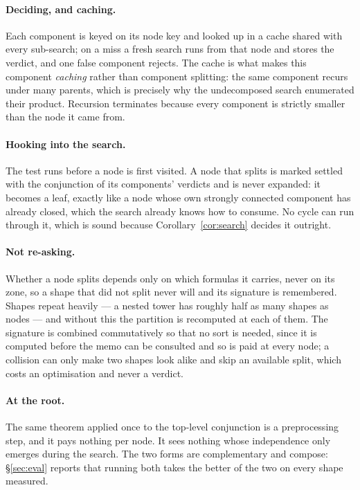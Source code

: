\paragraph{Deciding, and caching.} Each component is keyed on its node key and
looked up in a cache shared with every sub-search; on a miss a fresh search runs
from that node and stores the verdict, and one false component rejects. The
cache is what makes this component \emph{caching} rather than component
splitting: the same component recurs under many parents, which is precisely why
the undecomposed search enumerated their product. Recursion terminates because
every component is strictly smaller than the node it came from.

\paragraph{Hooking into the search.} The test runs before a node is first
visited. A node that splits is marked settled with the conjunction of its
components' verdicts and is never expanded: it becomes a leaf, exactly like a
node whose own strongly connected component has already closed, which the search
already knows how to consume. No cycle can run through it, which is sound
because Corollary~\ref{cor:search} decides it outright.

\paragraph{Not re-asking.} Whether a node splits depends only on which formulas
it carries, never on its zone, so a shape that did not split never will and its
signature is remembered. Shapes repeat heavily --- a nested tower has roughly
half as many shapes as nodes --- and without this the partition is recomputed at
each of them. The signature is combined commutatively so that no sort is needed,
since it is computed before the memo can be consulted and so is paid at every
node; a collision can only make two shapes look alike and skip an available
split, which costs an optimisation and never a verdict.

\paragraph{At the root.} The same theorem applied once to the top-level
conjunction is a preprocessing step, and it pays nothing per node. It sees
nothing whose independence only emerges during the search. The two forms are
complementary and compose: \S\ref{sec:eval} reports that running both takes the
better of the two on every shape measured.
